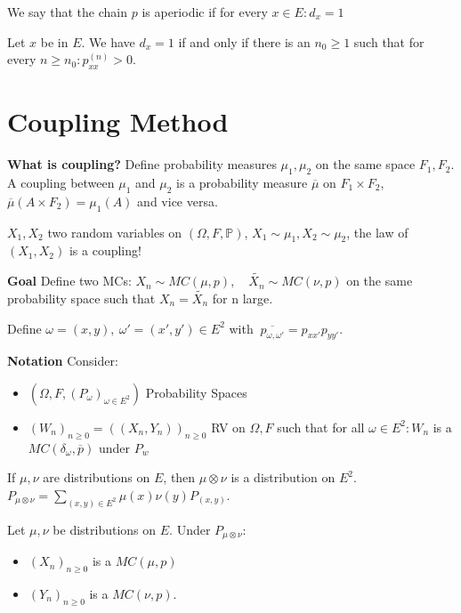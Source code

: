 \begin{defn}
	We say that the chain $p$ is aperiodic if for every $x \in E: d_x=1$
\end{defn}

\begin{prop}[]
	Let $x$ be in $E$. We have $d_x=1$ if and only if there is an $n_0 \geq 1$ such that for every $n \geq n_0: p_{xx}^{(n)}>0$.
\end{prop}

\section{Coupling Method}
\textbf{What is coupling?}
Define probability measures $\mu_1, \mu_2$ on the same space $F_1,F_2$. A coupling between $\mu_1$ and $\mu_2$ is a probability measure $\overline{\mu }$ on $F_1 \times F_2$, 
$\overline{\mu }(A \times F_2)=\mu_1(A)$ and vice versa. 

$X_1, X_2$ two random variables on $(\Omega, F, \mathbb{P}) $, $X_1 \sim \mu_1, X_2 \sim \mu_2$, the law of $(X_1,X_2)$ is a coupling!

\noindent
\textbf{Goal} Define two MCs: $X_n \sim MC(\mu, p), \quad \tilde{X_n} \sim MC(\nu, p) $ on the same probability space such that $X_n = \tilde{X_n}$ for n large.

\begin{defn}
	Define $\omega=(x,y), \ \omega'=(x',y') \in E^2$ with $\ \overline{p_{\omega, \omega'}}=p_{xx'}p_{yy'}$.
\end{defn}

\noindent
\textbf{Notation} Consider:
\begin{itemize}
	\item $(\Omega, F, (P_\omega)_{\omega \in E^2})$ Probability Spaces
	\item $(W_n)_{n\geq 0}=((X_n,Y_n))_{n\geq 0}$ RV on $\Omega, F$ such that for all $\omega \in E^2: W_n$ is a $MC(\delta_\omega, \overline{p})$ under $P_w$
\end{itemize}

\begin{rmk}[]
	If $\mu, \nu $ are distributions on $E$, then $\mu \otimes \nu $ is a distribution on $E^2$. $P_{\mu \otimes \nu }= \sum_{(x,y)\in E^2}^{}\mu (x) \nu (y) P_{(x,y)} $.
\end{rmk}

\begin{prop}[]
	Let $\mu,\nu $ be distributions on $E$. Under $P_{\mu \otimes \nu }:$ 
\begin{itemize}
	\item $(X_n)_{n\geq 0}$ is a $MC(\mu ,p)$ 
	\item $(Y_n)_{n\geq 0}$ is a $MC(\nu ,p)$.
\end{itemize}

\end{prop}

